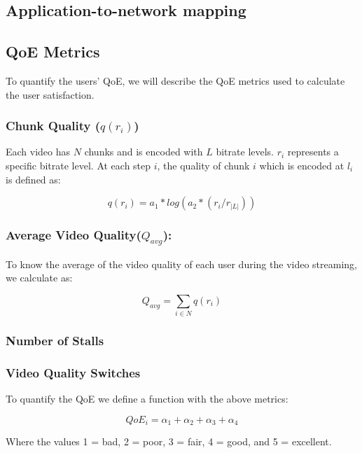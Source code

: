 \subsection{Application-to-network mapping}


\subsection{QoE Metrics}

To quantify the users' QoE, we will describe the QoE metrics used to calculate the user satisfaction. 

\subsubsection{Chunk Quality ($q(r_i)$)} Each video has $N$ chunks and is encoded with $L$ bitrate levels. $r_i$ represents a specific bitrate level. At each step $i$, the quality of chunk $i$ which is encoded at $l_i$ is defined as:

$$
q(r_i) = a_1 * log(a_2 * (r_i/ r_{|L|}))
$$


\subsubsection{Average Video Quality($Q_{avg}$):} To know the average of the video quality of each user during the video streaming, we calculate as:

$$
Q_{avg} = \sum_{i \in N} q(r_i)
$$

\subsubsection{Number of Stalls}

\subsubsection{Video Quality Switches}

To quantify the QoE we define a function with the above metrics:

$$
QoE_i = \alpha_1 + \alpha_2 + \alpha_3 + \alpha_4
$$

Where the values 1 = bad, 2 = poor, 3 = fair, 4 = good, and 5 = excellent.

